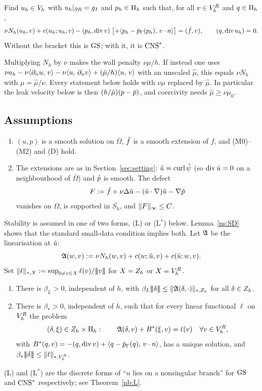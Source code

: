 \begin{definition}\label{ns:def}
Find $u_h\in V_h$ with $u_h|_{\partial R}=g_I$ and $p_h\in\Pi_h$ such that, for all $v\in V_h^R$ and $q\in\Pi_h$,
\[
\nu N_h(u_h,v)+c(u_h;u_h,v)-(p_h,\operatorname{div} v)\;\bigl[+\langle p_h-\bar p_{\Gamma}(p_h),\, v\cdot n\rangle\bigr]=(\tilde f,v),\qquad(q,\operatorname{div} u_h)=0 .
\]
Without the bracket this is $\mathrm{GS}$; with it, it is $\mathrm{CNS}^\ast$.
\end{definition}

\begin{remark}\label{ns:conv}
Multiplying $N_h$ by $\nu$ makes the wall penalty $\nu\mu/h$. If instead one uses $\nu a_h-\nu\langle \partial_n u,\, v\rangle-\nu\langle u,\, \partial_n v\rangle+(\hat\mu/h)\langle u,\, v\rangle$ with an unscaled $\hat\mu$, this equals $\nu N_h$ with $\mu=\hat\mu/\nu$. Every statement below holds with $\nu\mu$ replaced by $\hat\mu$. In particular the leak velocity below is then $(h/\hat\mu)(p-\bar p)$, and coercivity needs $\hat\mu\ge\nu\mu_0$.
\end{remark}

\subsection{Assumptions}
\begin{assumption}\label{ns:ass}\leavevmode
\begin{enumerate}[label=(NS\arabic*)]
\item $(u,p)$ is a smooth solution on $\overline\Omega$, $\tilde f$ is a smooth extension of $f$, and (M0)--(M2) and (D) hold.
\item The extensions are as in Section~\ref{sec:setting}: $\tilde u=\operatorname{curl}\tilde\psi$ (so $\operatorname{div}\tilde u=0$ on a neighbourhood of $\overline\Omega$) and $\tilde p$ is smooth. The defect
\[
F:=\tilde f+\nu\Delta\tilde u-(\tilde u\cdot\nabla)\tilde u-\nabla\tilde p
\]
vanishes on $\Omega$, is supported in $\overline{S_h}$, and $\lVert F\rVert_\infty\le C$.
\end{enumerate}
\end{assumption}

Stability is assumed in one of two forms, (L) or (L$^\ast$) below. Lemma~\ref{ns:SD} shows that the standard small-data condition implies both. Let $\mathfrak A$ be the linearisation at $\tilde u$:
\[
\mathfrak A(w,v):=\nu N_h(w,v)+c(w;\tilde u,v)+c(\tilde u;w,v).
\]
Set $\lVert \ell\rVert_{\ast,X}:=\sup_{0\ne v\in X}\ell(v)/|\!|\!|v|\!|\!|$ for $X=Z_h$ or $X=V_h^R$.

\begin{enumerate}[label=(L\arabic*)]
\item[(L)] There is $\beta_L>0$, independent of $h$, with $\beta_L|\!|\!|\delta|\!|\!|\le\lVert \mathfrak A(\delta,\cdot)\rVert_{\ast,Z_h}$ for all $\delta\in Z_h$.
\item[(L$^\ast$)] There is $\beta_\ast>0$, independent of $h$, such that for every linear functional $\ell$ on $V_h^R$ the problem
\[
(\delta,\xi)\in Z_h\times\Pi_h:\qquad \mathfrak A(\delta,v)+B^\ast(\xi,v)=\ell(v)\quad\forall v\in V_h^R,
\]
with $B^\ast(q,v)=-(q,\operatorname{div} v)+\langle q-\bar p_{\Gamma}(q),\, v\cdot n\rangle$, has a unique solution, and $\beta_\ast|\!|\!|\delta|\!|\!|\le\lVert \ell\rVert_{\ast,V_h^R}$.
\end{enumerate}
(L) and (L$^\ast$) are the discrete forms of ``$u$ lies on a nonsingular branch'' for $\mathrm{GS}$ and $\mathrm{CNS}^\ast$ respectively; see Theorem~\ref{nb:L}.

